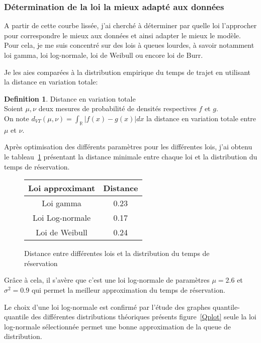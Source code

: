 \documentclass[12pt,a4paper]{article}
\theoremstyle{definition}
\newtheorem{definition}{Definition}
\begin{document}
{\subsubsection{Détermination de la loi la mieux adapté aux données}

A partir de cette courbe lissée, j'ai cherché à déterminer par quelle loi l'approcher pour correspondre le mieux aux données et ainsi adapter le mieux le modèle. Pour cela, je me suis concentré sur des lois à queues lourdes, à savoir notamment loi gamma, loi log-normale, loi de Weibull ou encore loi de Burr.

Je les aies comparées à la distribution empirique du temps de trajet en utilisant la distance en variation totale:

\begin{definition}{Distance en variation totale}\\
Soient $\mu,\nu$ deux mesures de probabilité de densités respectives $f$ et $g$.\\
On note $\displaystyle d_{VT}(\mu,\nu) = \int_{\mathbb{R}}|f(x)-g(x)|dx$ la distance en variation totale entre $\mu$ et $\nu$.
\end{definition}

Après optimisation des différents paramètres pour les différentes lois, j'ai obtenu le tableau~\ref{Distance_à_temps_réservation} présentant la distance minimale entre chaque loi et la distribution du temps de réservation.

\begin{figure}[h]
\label{Distance_à_temps_réservation}
\centering
\begin{tabular}{c|c}
Loi approximant & Distance\\
\hline
Loi gamma &  0.23\\
Loi Log-normale & 0.17 \\
Loi de Weibull & 0.24\\
\end{tabular}
\caption{Distance entre différentes lois et la distribution du temps de réservation}
\end{figure}

Grâce à cela, il s'avère que c'est une loi log-normale de paramètres $\mu = 2.6$ et $\sigma^2=0.9$ qui permet la meilleur approximation du temps de réservation.

Le choix d'une loi log-normale est confirmé par l'étude des graphes quantile-quantile des différentes distributions théoriques présents figure~\ref{Qplot} seule la loi log-normale sélectionnée permet une bonne approximation de la queue de distribution.



}
\end{document}
